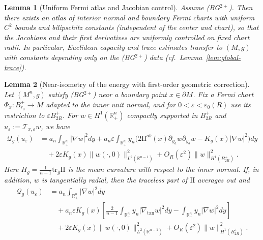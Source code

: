 \documentclass[10pt,a4paper]{amsart}
\newtheorem{lemma}{Lemma}
\newcommand{\R}{\mathbb{R}}
\begin{document}
\begin{lemma}[Uniform Fermi atlas and Jacobian control]\label{lem:atlas}
Assume \textup{(BG$^{2+}$)}. Then there exists an atlas of interior normal and boundary Fermi charts with uniform $C^2$ bounds and bilipschitz constants (independent of the center and chart), so that the Jacobians and their first derivatives are uniformly controlled on fixed chart radii. In particular, Euclidean capacity and trace estimates transfer to $(M,g)$ with constants depending only on the \textup{(BG$^{2+}$)} data (cf.\ Lemma~\ref{lem:global-trace}).
\end{lemma}

\begin{lemma}[Near-isometry of the energy with first-order geometric correction]\label{lem:near-iso-energy}
Let $(M^n,g)$ satisfy \textup{(BG$^{2+}$)} near a boundary point $x\in\partial M$.  Fix a Fermi chart $\Phi_x:B_{r_0}^+\to M$ adapted to the \emph{inner} unit normal, and for $0<\varepsilon<\varepsilon_0(R)$ use its restriction to $\varepsilon B_{2R}^+$.
 For $w\in H^1(\R^n_+)$ compactly supported in $B^+_{2R}$ and $u_\varepsilon:=\mathcal T_{x,\varepsilon}w$, we have
\begin{align}
\mathcal Q_g(u_\varepsilon)
&= a_n\int_{\R_+^n} |\nabla w|^2dy
+ a_n\varepsilon\int_{\R_+^n} y_n\Big(2\mathrm{II}^{ab}(x)\partial_{y_a}w\partial_{y_b}w - K_g(x)|\nabla w|^2\Big)dy \nonumber\\
&\quad + 2\varepsilon K_g(x)\|w(\cdot,0)\|_{L^2(\R^{n-1})}^2
+ O_R(\varepsilon^2)\|w\|_{H^1(B^+_{2R})}^2. \label{eq:Q-first-order}
\end{align}
Here $H_g=\frac{1}{n-1}\mathrm{tr}_{\bar g}\mathrm{II}$ is the mean curvature with respect to the inner normal. If, in addition, $w$ is tangentially radial, then the traceless part of $\mathrm{II}$ averages out and
\begin{align}
\mathcal Q_g(u_\varepsilon)
&= a_n\int_{\R_+^n} |\nabla w|^2dy \nonumber\\
&\quad + a_n\varepsilon K_g(x)\left[\frac{2}{n-1}\int_{\R_+^n} y_n|\nabla_{\tan} w|^2dy - \int_{\R_+^n} y_n|\nabla w|^2dy\right] \nonumber\\
&\quad + 2\varepsilon K_g(x)\|w(\cdot,0)\|_{L^2(\R^{n-1})}^2
+ O_R(\varepsilon^2)\|w\|_{H^1(B^+_{2R})}^2.
\label{eq:Q-isotropic}
\end{align}
\end{lemma}
\end{document}
